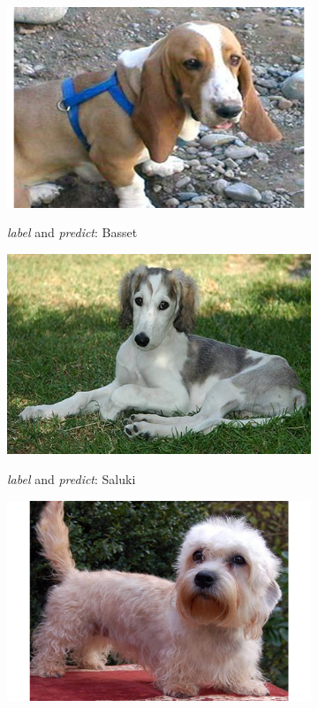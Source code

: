 \documentclass{article}
\begin{document}
\newpage
\begin{figure}[h]
	\centering
	\label{fig:success}
	\begin{subfigure}{0.32\linewidth}
		\centering
		\includegraphics[width=\linewidth]{pics/success_basset}
		\caption{ }
		\emph{label} and \emph{predict}: Basset
		\label{fig:success_basset}
	\end{subfigure}
	\begin{subfigure}{0.32\linewidth}
		\centering
		\includegraphics[width=\linewidth]{pics/success_saluki}
		\caption{ }
		\emph{label} and \emph{predict}: Saluki
		\label{fig:dsuccess_saluki}
	\end{subfigure}  
	\begin{subfigure}{0.32\linewidth}
		\centering
		\includegraphics[width=\linewidth]{pics/success_dandie}

\end{subfigure}
\end{figure}
\end{document}
